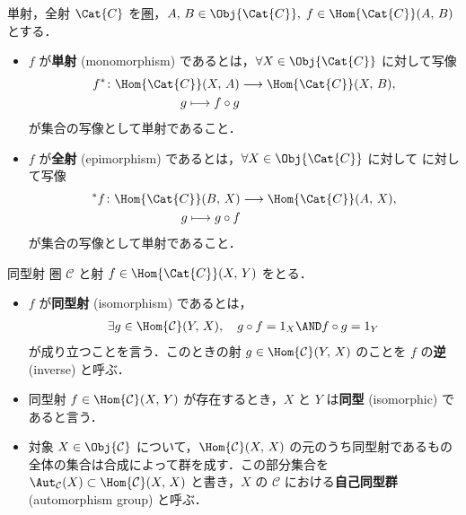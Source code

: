 \documentclass[algtopo_main]{subfiles}
\begin{document}
\begin{mydef}[label=def:mono-epi]{単射，全射}
    $\Cat{C}$ を\hyperref[def:category]{圏}，$A,\, B \in \Obj{\Cat{C}},\; f \in \Hom{\Cat{C}}(A,\, B)$ とする．
    \begin{itemize}
        \item $f$ が\textbf{単射} (monomorphism) であるとは，$\forall X \in \Obj{\Cat{C}}$ に対して写像
        \begin{align}
            f^* \colon \Hom{\Cat{C}} (X,\, A) &\lto \Hom{\Cat{C}} (X,\, B), \\
            g \lmto f \circ g
        \end{align}
        が集合の写像として単射であること．
        \item $f$ が\textbf{全射} (epimorphism) であるとは，$\forall  X \in \Obj{\Cat{C}}$ に対して
        に対して写像
        \begin{align}
            {}^* f \colon \Hom{\Cat{C}} (B,\, X) &\lto \Hom{\Cat{C}} (A,\, X), \\
            g \lmto g \circ f
        \end{align}
        が集合の写像として単射であること．
    \end{itemize}
\end{mydef}


\begin{mydef}[label=def:isomorphism]{同型射}
    圏 $\mathcal{C}$ と射 $f \in \Hom{\Cat{C}}(X,\, Y)$ をとる．
    \begin{itemize}
        \item $f$ が\textbf{同型射} (isomorphism) であるとは，
        \begin{align}
            \exists g \in \Hom{\mathcal{C}}(Y,\, X),\quad g \circ f = 1_X \AND f \circ g = 1_Y
        \end{align}
        が成り立つことを言う．このときの射 $g \in \Hom{\mathcal{C}}(Y,\, X)$ のことを $f$ の\textbf{逆} (inverse) と呼ぶ．
        \item 同型射 $f \in \Hom{\mathcal{C}}(X,\, Y)$ が存在するとき，$X$ と $Y$ は\textbf{同型} (isomorphic) であると言う．
        \item 対象 $X \in \Obj{\mathcal{C}}$ について，$\Hom{\mathcal{C}}(X,\, X)$ の元のうち同型射であるもの全体の集合は合成によって群を成す．この部分集合を $\Aut_{\mathcal{C}}(X) \subset \Hom{\mathcal{C}}(X,\, X)$ と書き，$X$ の $\mathcal{C}$ における\textbf{自己同型群} (automorphism group) と呼ぶ．
    \end{itemize}
\end{mydef}
\end{document}
